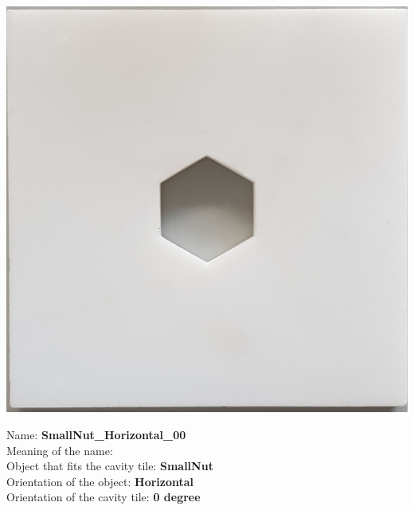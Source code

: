 \documentclass{article}
\begin{document}
\begin{minipage}[b]{0.35\linewidth}

\begin{center}
\includegraphics[height=5\baselineskip]  {images/SmallNut_Horizontal_00.jpg}
\end{center}

\end{minipage}
\begin{minipage}[b]{0.65\linewidth}
\begin{flushleft}
Name: \textbf{SmallNut\_Horizontal\_00} \\ 
Meaning of the name: \\ 
Object that fits the cavity tile: \textbf{SmallNut} \\
Orientation of the object: \textbf{Horizontal} \\
Orientation of the cavity tile:\textbf{ 0 degree}
\end{flushleft}

\end{minipage}
\end{document}
